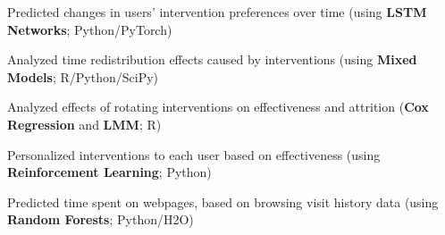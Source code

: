 \documentclass[margin,line]{resume}
\begin{document}
\begin{resume}
\begin{compactitem}
\item Predicted changes in users' intervention preferences over time (using \textbf{LSTM Networks}; Python/PyTorch)
\item Analyzed time redistribution effects caused by interventions (using \textbf{Mixed Models}; R/Python/SciPy)
\item Analyzed effects of rotating interventions on effectiveness and attrition (\textbf{Cox Regression} and \textbf{LMM}; R)
\item Personalized interventions to each user based on effectiveness (using \textbf{Reinforcement Learning}; Python)
\item Predicted time spent on webpages, based on browsing visit history data (using \textbf{Random Forests}; Python/H2O)
\end{compactitem}






\end{resume}
\end{document}
